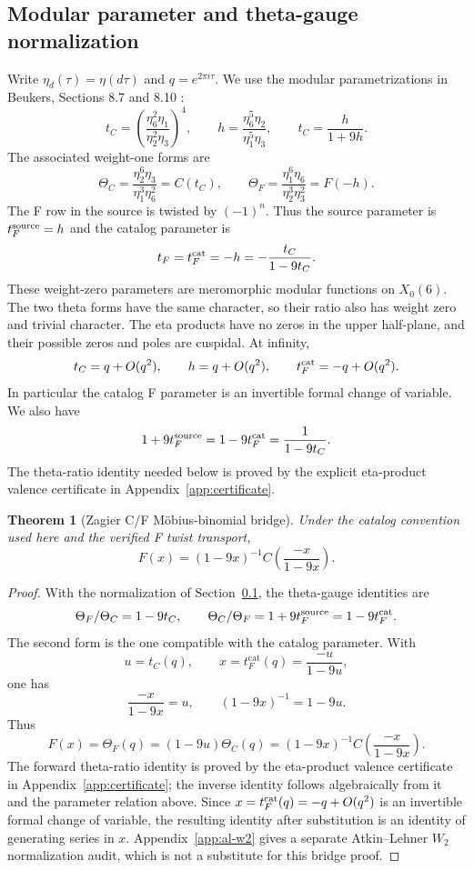 \documentclass[11pt,a4paper]{article}
\newtheorem{theorem}{Theorem}[section]
\begin{document}
\subsection{Modular parameter and theta-gauge normalization}
\label{subsec:theta-normalization}

Write $\eta_d(\tau)=\eta(d\tau)$ and $q=e^{2\pi i\tau}$.  We use the
modular parametrizations in Beukers, Sections 8.7 and 8.10
\cite{beukers_2025_supercongruences_modular_forms}:
\[
 t_C=\left(\frac{\eta_6^2\eta_1}{\eta_2^2\eta_3}\right)^4,
 \qquad h=\frac{\eta_6^5\eta_2}{\eta_1^5\eta_3},
 \qquad t_C=\frac{h}{1+9h}.
\]
The associated weight-one forms are
\[
 \Theta_C=\frac{\eta_2^6\eta_3}{\eta_1^3\eta_6^2}=C(t_C),
 \qquad
 \Theta_F=\frac{\eta_1^6\eta_6}{\eta_2^3\eta_3^2}=F(-h).
\]
The F row in the source is twisted by $(-1)^n$.  Thus the source parameter
is $t_F^{\rm source}=h$ and the catalog parameter is
\[
 t_F=t_F^{\rm cat}=-h=-\frac{t_C}{1-9t_C}.
\]
These weight-zero parameters are meromorphic modular functions on $X_0(6)$.
The two theta forms have the same character, so their ratio also has weight
zero and trivial character.  The eta products have no zeros in the upper
half-plane, and their possible zeros and poles are cuspidal.  At infinity,
\[
 t_C=q+O(q^2),\qquad h=q+O(q^2),\qquad t_F^{\rm cat}=-q+O(q^2).
\]
In particular the catalog F parameter is an invertible formal change of
variable.  We also have
\[
 1+9t_F^{\rm source}=1-9t_F^{\rm cat}=\frac{1}{1-9t_C}.
\]
The theta-ratio identity needed below is proved by the explicit eta-product
valence certificate in Appendix~\ref{app:certificate}.

\begin{theorem}[Zagier C/F M\"obius-binomial bridge]
\label{thm:cf-bridge}
Under the catalog convention used here and the verified F twist transport,
\[
  F(x)=(1-9x)^{-1} C\!\left(\frac{-x}{1-9x}\right).
\]
\end{theorem}

\begin{proof}
With the normalization of Section~\ref{subsec:theta-normalization}, the
theta-gauge identities are
\[
  \Theta_F/\Theta_C = 1-9t_C,\qquad
  \Theta_C/\Theta_F = 1+9t_F^{\rm source}=1-9t_F^{\rm cat}.
\]
The second form is the one compatible with the catalog parameter.  With
\[
  u=t_C(q),\qquad x=t_F^{\mathrm{cat}}(q)=\frac{-u}{1-9u},
\]
one has
\[
  \frac{-x}{1-9x}=u,\qquad (1-9x)^{-1}=1-9u.
\]
Thus
\[
  F(x)=\Theta_F(q)=(1-9u)\Theta_C(q)
      =(1-9x)^{-1}C\!\left(\frac{-x}{1-9x}\right).
\]
The forward theta-ratio identity is proved by the eta-product valence
certificate in Appendix~\ref{app:certificate}; the inverse identity follows
algebraically from it and the parameter relation above.  Since
$x=t_F^{\rm cat}(q)=-q+O(q^2)$ is an invertible formal change of variable,
the resulting identity after substitution is an identity of generating
series in $x$.  Appendix~\ref{app:al-w2} gives a separate Atkin--Lehner
$W_2$ normalization audit, which is not a substitute for this bridge proof.

\end{proof}
\end{document}
